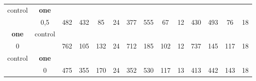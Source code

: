 \begin{table}[]
{\begin{tabular}{|c|c|c|c|c|c|c|c|c|c|c|c|c|c|}
control & \cellcolor{blue!15}\textbf{one}& {\color[HTML]{00009B} } & {\color[HTML]{9A0000} } & {\color[HTML]{009901} } &  & {\color[HTML]{00009B} } & {\color[HTML]{9A0000} } & {\color[HTML]{009901} } &  & {\color[HTML]{00009B} } & {\color[HTML]{9A0000} } & {\color[HTML]{009901} } &  \\ 
 & \cellcolor{ blue!15}0,5 & \multirow{-2}{*}{{\color[HTML]{00009B} 482}} & \multirow{-2}{*}{{\color[HTML]{9A0000} 432}} & \multirow{-2}{*}{{\color[HTML]{009901} 85}} & \multirow{-2}{*}{24} & \multirow{-2}{*}{{\color[HTML]{00009B} 377}} & \multirow{-2}{*}{{\color[HTML]{9A0000} 555}} & \multirow{-2}{*}{{\color[HTML]{009901} 67}} & \multirow{-2}{*}{12} & \multirow{-2}{*}{{\color[HTML]{00009B} 430}} & \multirow{-2}{*}{{\color[HTML]{9A0000} 493}} & \multirow{-2}{*}{{\color[HTML]{009901} 76}} & \multirow{-2}{*}{18} \\ \hline

\cellcolor{blue!15}\textbf{one} & control& {\color[HTML]{00009B} } & {\color[HTML]{9A0000} } & {\color[HTML]{009901} } &  & {\color[HTML]{00009B} } & {\color[HTML]{9A0000} } & {\color[HTML]{009901} } &  & {\color[HTML]{00009B} } & {\color[HTML]{9A0000} } & {\color[HTML]{009901} } &  \\ 
\cellcolor{ blue!15}0 &  & \multirow{-2}{*}{{\color[HTML]{00009B} 762}} & \multirow{-2}{*}{{\color[HTML]{9A0000} 105}} & \multirow{-2}{*}{{\color[HTML]{009901} 132}} & \multirow{-2}{*}{24} & \multirow{-2}{*}{{\color[HTML]{00009B} 712}} & \multirow{-2}{*}{{\color[HTML]{9A0000} 185}} & \multirow{-2}{*}{{\color[HTML]{009901} 102}} & \multirow{-2}{*}{12} & \multirow{-2}{*}{{\color[HTML]{00009B} 737}} & \multirow{-2}{*}{{\color[HTML]{9A0000} 145}} & \multirow{-2}{*}{{\color[HTML]{009901} 117}} & \multirow{-2}{*}{18} \\ \hline

control & \cellcolor{blue!15}\textbf{one}& {\color[HTML]{00009B} } & {\color[HTML]{9A0000} } & {\color[HTML]{009901} } &  & {\color[HTML]{00009B} } & {\color[HTML]{9A0000} } & {\color[HTML]{009901} } &  & {\color[HTML]{00009B} } & {\color[HTML]{9A0000} } & {\color[HTML]{009901} } &  \\ 
 & \cellcolor{ blue!15}0 & \multirow{-2}{*}{{\color[HTML]{00009B} 475}} & \multirow{-2}{*}{{\color[HTML]{9A0000} 355}} & \multirow{-2}{*}{{\color[HTML]{009901} 170}} & \multirow{-2}{*}{24} & \multirow{-2}{*}{{\color[HTML]{00009B} 352}} & \multirow{-2}{*}{{\color[HTML]{9A0000} 530}} & \multirow{-2}{*}{{\color[HTML]{009901} 117}} & \multirow{-2}{*}{13} & \multirow{-2}{*}{{\color[HTML]{00009B} 413}} & \multirow{-2}{*}{{\color[HTML]{9A0000} 442}} & \multirow{-2}{*}{{\color[HTML]{009901} 143}} & \multirow{-2}{*}{18} \\ \hline


\end{tabular}}
\end{table}
